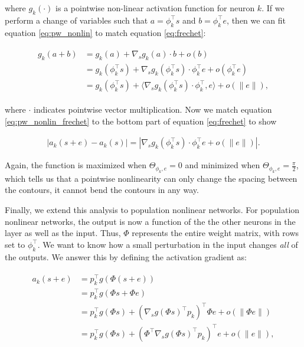 where $g_{k}(\cdot)$ is a pointwise non-linear activation function for neuron $k$. If we perform a change of variables such that $a = \phi_{k}^\top s$ and $b = \phi_{k}^\top e$, then we can fit equation \ref{eq:pw_nonlin} to match equation \ref{eq:frechet}:

\begin{align}\label{eq:pw_nonlin_frechet}
\begin{split}
    g_{k}(a + b) &= g_{k}(a) + \nabla_{s}g_{k}(a) \cdot b + o(b) \\
    &=g_{k}(\phi_{k}^\top s) + \nabla_{s}g_{k}(\phi_{k}^\top s) \cdot \phi_{k}^\top e + o(\phi_{k}^\top e)\\
    &=g_{k}(\phi_{k}^\top s) + \langle\nabla_{s}g_{k}(\phi_{k}^\top s) \cdot \phi_{k}^\top, e\rangle + o(\|e\|),
\end{split}
\end{align}

where $\cdot$ indicates pointwise vector multiplication. Now we match equation \ref{eq:pw_nonlin_frechet} to the bottom part of equation \ref{eq:frechet} to show 

\begin{equation}
\begin{split}
    |a_{k}(s+e) - a_{k}(s)| = |\nabla_{s}g_{k}(\phi_{k}^\top s) \cdot \phi_{k}^\top e + o(\|e\|)|.
\end{split}
\end{equation}

Again, the function is maximized when $\Theta_{\phi_{k}, e}=0$ and minimized when $\Theta_{\phi_{k}, e}=\tfrac{\pi}{2}$, which tells us that a pointwise nonlinearity can only change the spacing between the contours, it cannot bend the contours in any way.

Finally, we extend this analysis to population nonlinear networks. For population nonlinear networks, the output is now a function of the the other neurons in the layer as well as the input. Thus, $\Phi$ represents the entire weight matrix, with rows set to $\phi_{k}^\top$. We want to know how a small perturbation in the input changes \emph{all} of the outputs. We answer this by defining the activation gradient as:

\begin{align}\label{eq:pop_nonlinear}
\begin{split}
   a_{k}(s+e) &= p_{k}^\top g(\Phi(s+e)) \\
   &= p_{k}^\top g(\Phi s + \Phi e) \\
   &= p_{k}^\top g(\Phi s) + (\nabla_{s}g(\Phi s)^\top p_{k})^\top \Phi e + o(\|\Phi e\|) \\
   &= p_{k}^\top g(\Phi s) + (\Phi^\top \nabla_{s}g(\Phi s)^\top p_{k})^\top e + o(\|e\|),
\end{split}
\end{align}

